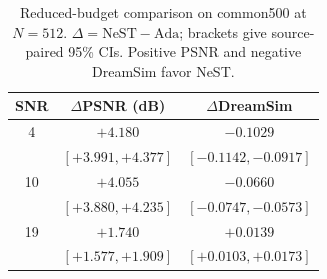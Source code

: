 \begin{table}[t]
\caption{Reduced-budget comparison on common500 at $N=512$. $\Delta=\mathrm{NeST}-\mathrm{Ada}$; brackets give source-paired 95\% CIs. Positive PSNR and negative DreamSim favor NeST.}
\label{tab:reduced}
\centering\footnotesize
\setlength{\tabcolsep}{4pt}
\begin{tabular}{ccc}
\toprule
SNR & $\Delta$PSNR (dB) & $\Delta$DreamSim \\
\midrule
4 & $+4.180$ & $-0.1029$ \\
 & $[+3.991,+4.377]$ & $[-0.1142,-0.0917]$ \\
10 & $+4.055$ & $-0.0660$ \\
 & $[+3.880,+4.235]$ & $[-0.0747,-0.0573]$ \\
19 & $+1.740$ & $+0.0139$ \\
 & $[+1.577,+1.909]$ & $[+0.0103,+0.0173]$ \\
\bottomrule
\end{tabular}
\end{table}
